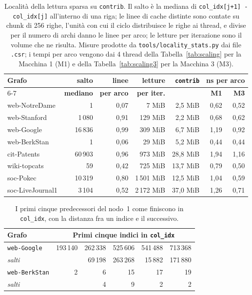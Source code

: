 \documentclass[11pt,a4paper]{article}
\begin{document}
\begin{table}[h]
\centering
\caption{Località della lettura sparsa su \texttt{contrib}. Il salto è la
mediana di \texttt{col\_idx[j+1] - col\_idx[j]} all'interno di una riga; le
linee di cache distinte sono contate su chunk di 256 righe, l'unità con cui
il ciclo distribuisce le righe ai thread, e divise per il numero di archi danno le linee per
arco; le letture per iterazione sono il volume che ne risulta.
Misure prodotte da \texttt{tools/locality\_stats.py} dai file \texttt{.csr};
i tempi per arco vengono dai 4 thread della Tabella~\ref{tab:scaling} per
la Macchina 1 (M1) e della Tabella~\ref{tab:scaling3} per la Macchina 3 (M3).}
\label{tab:localita}
\begin{tabular}{@{}lrrrrrr@{}}
\toprule
\textbf{Grafo} & \textbf{salto} & \textbf{linee} & \textbf{letture} &
\textbf{\texttt{contrib}} & \multicolumn{2}{c}{\textbf{ns per arco}} \\
\cmidrule(l){6-7}
 & \textbf{mediano} & \textbf{per arco} & \textbf{per iter.} & &
\textbf{M1} & \textbf{M3} \\
\midrule
web-NotreDame    & 1        & 0,07 & 7 MiB      & 2,5 MiB  & 0,62 & 0,52 \\
web-Stanford     & 1\,080   & 0,91 & 129 MiB    & 2,2 MiB  & 0,68 & 0,62 \\
web-Google       & 16\,836  & 0,99 & 309 MiB    & 6,7 MiB  & 1,19 & 0,92 \\
web-BerkStan     & 1        & 0,06 & 29 MiB     & 5,2 MiB  & 0,44 & 0,44 \\
cit-Patents      & 60\,903  & 0,96 & 973 MiB    & 28,8 MiB & 1,94 & 1,16 \\
wiki-topcats     & 59       & 0,42 & 725 MiB    & 13,7 MiB & 0,79 & 0,50 \\
soc-Pokec        & 10\,319  & 0,80 & 1\,501 MiB & 12,5 MiB & 1,04 & 0,59 \\
soc-LiveJournal1 & 3\,104   & 0,52 & 2\,172 MiB & 37,0 MiB & 1,26 & 0,71 \\
\bottomrule
\end{tabular}
\end{table}

\begin{table}[h]
\centering
\caption{I primi cinque predecessori del nodo~1 come finiscono in
\texttt{col\_idx}, con la distanza fra un indice e il successivo.}
\label{tab:riga-nodo1}
\begin{tabular}{@{}lrrrrr@{}}
\toprule
\textbf{Grafo} & \multicolumn{5}{c}{\textbf{Primi cinque indici in \texttt{col\_idx}}} \\
\midrule
\texttt{web-Google}   & 193\,140 & 262\,338  & 525\,606  & 541\,488 & 713\,368 \\
\quad\emph{salti}     &          & 69\,198   & 263\,268  & 15\,882  & 171\,880 \\
\addlinespace
\texttt{web-BerkStan} & 2        & 6         & 15        & 17       & 19 \\
\quad\emph{salti}     &          & 4         & 9         & 2        & 2 \\
\bottomrule
\end{tabular}
\end{table}
\end{document}
